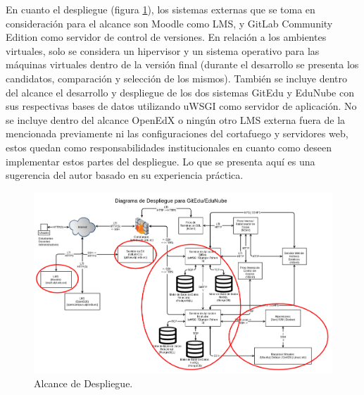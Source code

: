 En cuanto el despliegue (figura \ref{alc_desp_ge_en}), los sistemas externas que se toma en consideración para el alcance son Moodle como LMS, y GitLab Community Edition como servidor de control de versiones. En relación a los ambientes virtuales, solo se considera un hipervisor y un sistema operativo para las máquinas virtuales dentro de la versión final (durante el desarrollo se presenta los candidatos, comparación y selección de los mismos). También se incluye dentro del alcance el desarrollo y despliegue de los dos sistemas GitEdu y EduNube con sus respectivas bases de datos utilizando uWSGI como servidor de aplicación. No se incluye dentro del alcance OpenEdX o ningún otro LMS externa fuera de la mencionada previamente ni las configuraciones del cortafuego y servidores web, estos quedan como responsabilidades institucionales en cuanto como deseen implementar estos partes del despliegue. Lo que se presenta aquí es una sugerencia del autor basado en su experiencia práctica.

\begin{landscape}

	\begin{figure}
	  \begin{center}
	    \includegraphics[width=1.4\textwidth]{Figures/alc_desp_ge_en.png}
	  \end{center}
	  \caption{Alcance de Despliegue.}
	  \label{alc_desp_ge_en}
	\end{figure}

\end{landscape}
